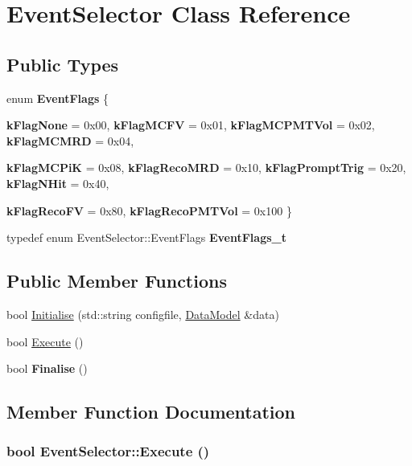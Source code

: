 \hypertarget{classEventSelector}{
\section{EventSelector Class Reference}
\label{classEventSelector}
}
\subsection*{Public Types}
\begin{DoxyCompactItemize}
\item 
enum {\bfseries EventFlags} \{ \par
{\bfseries kFlagNone} =  0x00, 
{\bfseries kFlagMCFV} =  0x01, 
{\bfseries kFlagMCPMTVol} =  0x02, 
{\bfseries kFlagMCMRD} =  0x04, 
\par
{\bfseries kFlagMCPiK} =  0x08, 
{\bfseries kFlagRecoMRD} =  0x10, 
{\bfseries kFlagPromptTrig} =  0x20, 
{\bfseries kFlagNHit} =  0x40, 
\par
{\bfseries kFlagRecoFV} =  0x80, 
{\bfseries kFlagRecoPMTVol} =  0x100
 \}
\item 
\hypertarget{classEventSelector_ab9f5d192d2badda9754e2e91f430a012}{
typedef enum EventSelector::EventFlags {\bfseries EventFlags\_\-t}}
\label{classEventSelector_ab9f5d192d2badda9754e2e91f430a012}

\end{DoxyCompactItemize}
\subsection*{Public Member Functions}
\begin{DoxyCompactItemize}
\item 
bool \hyperlink{classEventSelector_a839f44332021b0345d0277f68ae612a8}{Initialise} (std::string configfile, \hyperlink{classDataModel}{DataModel} \&data)
\item 
bool \hyperlink{classEventSelector_a0edbb6c1b1a8c3fcd9453d3dd5796005}{Execute} ()
\item 
\hypertarget{classEventSelector_a73c813845d7cfce13f160e94b44b56c1}{
bool {\bfseries Finalise} ()}
\label{classEventSelector_a73c813845d7cfce13f160e94b44b56c1}

\end{DoxyCompactItemize}


\subsection{Member Function Documentation}
\hypertarget{classEventSelector_a0edbb6c1b1a8c3fcd9453d3dd5796005}{
\subsubsection[{Execute}]{\setlength{\rightskip}{0pt plus 5cm}bool EventSelector::Execute ()}}
\label{classEventSelector_a0edbb6c1b1a8c3fcd9453d3dd5796005}


